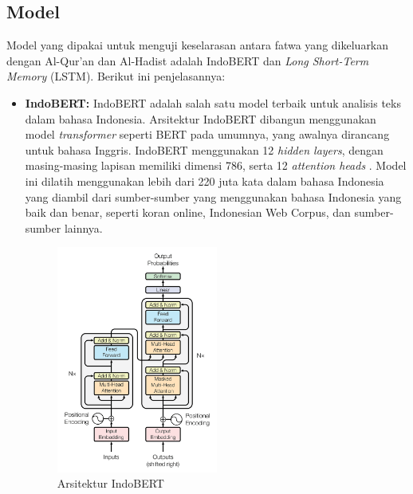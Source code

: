 \documentclass[12pt,a4paper]{article}
\begin{document}
\subsection{Model}
Model yang dipakai untuk menguji keselarasan antara  fatwa yang dikeluarkan dengan Al-Qur’an dan Al-Hadist adalah IndoBERT dan \textit{Long Short-Term Memory} (LSTM). Berikut ini penjelasannya:

\begin{itemize}
    \item \textbf{IndoBERT:} IndoBERT adalah salah satu model terbaik untuk analisis teks dalam bahasa Indonesia. Arsitektur IndoBERT dibangun menggunakan model \textit{transformer} seperti BERT pada umumnya, yang awalnya dirancang untuk bahasa Inggris. IndoBERT menggunakan 12 \textit{hidden layers}, dengan masing-masing lapisan memiliki dimensi 786, serta 12 \textit{attention heads} \cite{Juarto2023}. Model ini dilatih menggunakan lebih dari 220 juta kata dalam bahasa Indonesia yang diambil dari sumber-sumber yang menggunakan bahasa Indonesia yang baik dan benar, seperti koran online, Indonesian Web Corpus, dan sumber-sumber lainnya.

    \begin{figure}[H]
        \centering
        \includegraphics[width=0.5\textwidth]{images/bert.png}
        \caption{Arsitektur IndoBERT}
        \label{fig:bert}
    \end{figure}


\end{itemize}
\end{document}
